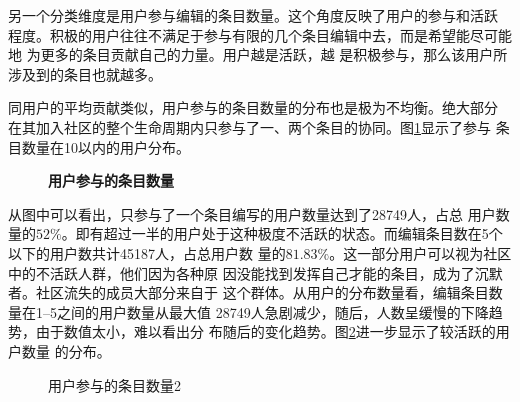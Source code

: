 另一个分类维度是用户参与编辑的条目数量。这个角度反映了用户的参与和活跃
程度。积极的用户往往不满足于参与有限的几个条目编辑中去，而是希望能尽可能地
为更多的条目贡献自己的力量。用户越是活跃，越
是积极参与，那么该用户所涉及到的条目也就越多。

同用户的平均贡献类似，用户参与的条目数量的分布也是极为不均衡。绝大部分
在其加入社区的整个生命周期内只参与了一、两个条目的协同。图\ref{fig:user-entry-1}显示了参与
条目数量在10以内的用户分布。
\begin{figure}[htb]
  \centering
  \caption{\small{\textbf{用户参与的条目数量}}}
  \label{fig:user-entry-1}
\end{figure}

从图中可以看出，只参与了一个条目编写的用户数量达到了28749人，占总
用户数量的$52\%$。即有超过一半的用户处于这种极度不活跃的状态。而编辑条目数在5个以下的用户数共计45187人，占总用户数
量的$81.83\%$。这一部分用户可以视为社区中的不活跃人群，他们因为各种原
因没能找到发挥自己才能的条目，成为了沉默者。社区流失的成员大部分来自于
这个群体。从用户的分布数量看，编辑条目数量在1--5之间的用户数量从最大值
28749人急剧减少，随后，人数呈缓慢的下降趋势，由于数值太小，难以看出分
布随后的变化趋势。图\ref{fig:user-entry-2}进一步显示了较活跃的用户数量
的分布。
\begin{figure}[htb]
  \centering
  \caption{\small{用户参与的条目数量2}}
  \label{fig:user-entry-2}
\end{figure}


